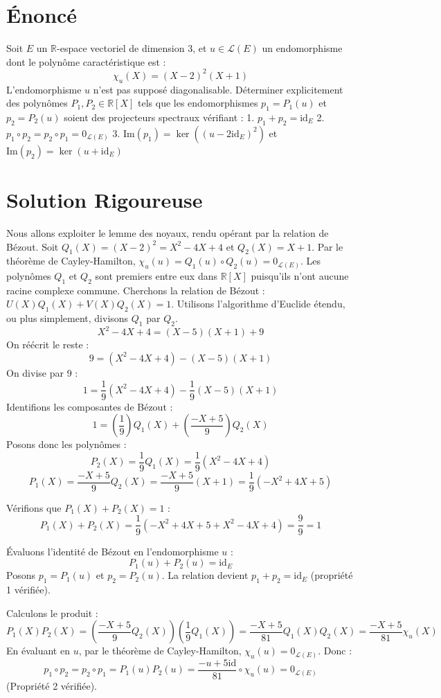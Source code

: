 \documentclass[11pt,a4paper]{article}
\begin{document}
\section{Énoncé}

Soit $E$ un $\mathbb{R}$-espace vectoriel de dimension 3, et $u \in \mathcal{L}(E)$ un endomorphisme dont le polynôme caractéristique est :
$$\chi_u(X) = (X - 2)^2 (X + 1)$$
L'endomorphisme $u$ n'est pas supposé diagonalisable.
Déterminer explicitement des polynômes $P_1, P_2 \in \mathbb{R}[X]$ tels que les endomorphismes $p_1 = P_1(u)$ et $p_2 = P_2(u)$ soient des projecteurs spectraux vérifiant :
1. $p_1 + p_2 = \text{id}_E$
2. $p_1 \circ p_2 = p_2 \circ p_1 = 0_{\mathcal{L}(E)}$
3. $\text{Im}(p_1) = \ker((u - 2\text{id}_E)^2)$ et $\text{Im}(p_2) = \ker(u + \text{id}_E)$

\section{Solution Rigoureuse}

Nous allons exploiter le lemme des noyaux, rendu opérant par la relation de Bézout.
Soit $Q_1(X) = (X-2)^2 = X^2 - 4X + 4$ et $Q_2(X) = X+1$.
Par le théorème de Cayley-Hamilton, $\chi_u(u) = Q_1(u) \circ Q_2(u) = 0_{\mathcal{L}(E)}$.
Les polynômes $Q_1$ et $Q_2$ sont premiers entre eux dans $\mathbb{R}[X]$ puisqu'ils n'ont aucune racine complexe commune.
Cherchons la relation de Bézout : $U(X) Q_1(X) + V(X) Q_2(X) = 1$.
Utilisons l'algorithme d'Euclide étendu, ou plus simplement, divisons $Q_1$ par $Q_2$.
$$X^2 - 4X + 4 = (X-5)(X+1) + 9$$
On réécrit le reste :
$$9 = (X^2 - 4X + 4) - (X-5)(X+1)$$
On divise par 9 :
$$1 = \frac{1}{9}(X^2 - 4X + 4) - \frac{1}{9}(X-5)(X+1)$$
Identifions les composantes de Bézout :
$$1 = \left( \frac{1}{9} \right) Q_1(X) + \left( \frac{-X+5}{9} \right) Q_2(X)$$
Posons donc les polynômes :
$$P_2(X) = \frac{1}{9} Q_1(X) = \frac{1}{9}(X^2 - 4X + 4)$$
$$P_1(X) = \frac{-X+5}{9} Q_2(X) = \frac{-X+5}{9}(X+1) = \frac{1}{9}(-X^2 + 4X + 5)$$

Vérifions que $P_1(X) + P_2(X) = 1$ :
$$P_1(X) + P_2(X) = \frac{1}{9}(-X^2 + 4X + 5 + X^2 - 4X + 4) = \frac{9}{9} = 1$$

Évaluons l'identité de Bézout en l'endomorphisme $u$ :
$$P_1(u) + P_2(u) = \text{id}_E$$
Posons $p_1 = P_1(u)$ et $p_2 = P_2(u)$. La relation devient $p_1 + p_2 = \text{id}_E$ (propriété 1 vérifiée).

Calculons le produit :
$$P_1(X) P_2(X) = \left( \frac{-X+5}{9} Q_2(X) \right) \left( \frac{1}{9} Q_1(X) \right) = \frac{-X+5}{81} Q_1(X) Q_2(X) = \frac{-X+5}{81} \chi_u(X)$$
En évaluant en $u$, par le théorème de Cayley-Hamilton, $\chi_u(u) = 0_{\mathcal{L}(E)}$. Donc :
$$p_1 \circ p_2 = p_2 \circ p_1 = P_1(u) P_2(u) = \frac{-u+5\text{id}}{81} \circ \chi_u(u) = 0_{\mathcal{L}(E)}$$
(Propriété 2 vérifiée).
\end{document}
